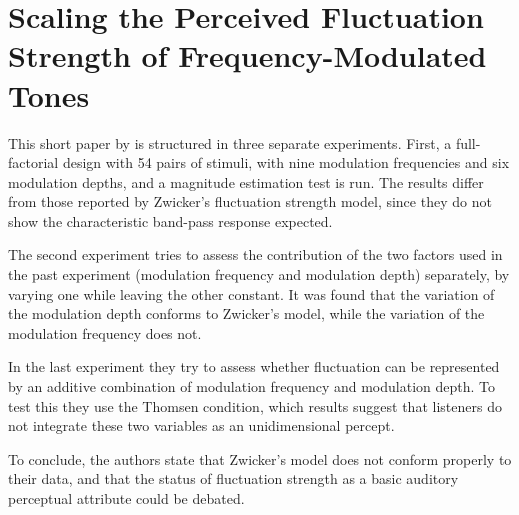 \section{Scaling the Perceived Fluctuation Strength of Frequency-Modulated
    Tones}

This short paper by \citeauthor{Wickelmaier2004Scaling} is structured in three
separate experiments. First, a full-factorial design with 54 pairs of stimuli,
with nine modulation frequencies and six modulation depths, and a magnitude
estimation test is run. The results differ from those reported by Zwicker's
fluctuation strength model, since they do not show the characteristic band-pass
response expected.

The second experiment tries to assess the contribution of the two factors used
in the past experiment (modulation frequency and modulation depth) separately,
by varying one while leaving the other constant. It was found that the variation
of the modulation depth conforms to Zwicker's model, while the variation of the
modulation frequency does not.

In the last experiment they try to assess whether fluctuation can be
represented by an additive combination of modulation frequency and modulation
depth. To test this they use the Thomsen condition, which results suggest that
listeners do not integrate these two variables as an unidimensional percept.

To conclude, the authors state that Zwicker's model does not conform properly
to their data, and that the status of fluctuation strength as a basic auditory
perceptual attribute could be debated.
